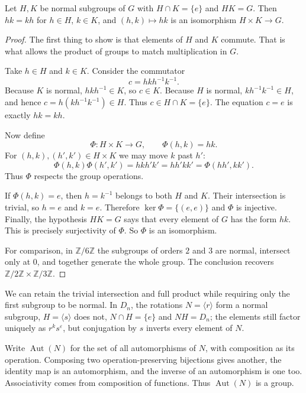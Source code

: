 \begin{proposition}\label{prop:internal}
Let $H,K$ be normal subgroups of $G$ with $H\cap K=\{e\}$ and $HK=G$. Then $hk=kh$ for $h\in H$, $k\in K$, and $(h,k)\mapsto hk$ is an isomorphism $H\times K\to G$.
\end{proposition}
\begin{proof}
The first thing to show is that elements of $H$ and $K$ commute.
That is what allows the product of groups to match multiplication in $G$.

Take $h\in H$ and $k\in K$. Consider the commutator
\[
c=hkh^{-1}k^{-1}.
\]
Because $K$ is normal, $hkh^{-1}\in K$, so $c\in K$.
Because $H$ is normal, $kh^{-1}k^{-1}\in H$, and hence
$c=h(kh^{-1}k^{-1})\in H$. Thus $c\in H\cap K=\{e\}$.
The equation $c=e$ is exactly $hk=kh$.

Now define
\[
\Phi:H\times K\longrightarrow G,\qquad
\Phi(h,k)=hk.
\]
For $(h,k),(h',k')\in H\times K$ we may move $k$ past $h'$:
\[
\Phi(h,k)\Phi(h',k')
=hkh'k'=hh'kk'
=\Phi(hh',kk').
\]
Thus $\Phi$ respects the group operations.

If $\Phi(h,k)=e$, then $h=k^{-1}$ belongs to both $H$ and
$K$. Their intersection is trivial, so $h=e$ and $k=e$.
Therefore $\ker\Phi=\{(e,e)\}$ and $\Phi$ is injective.
Finally, the hypothesis $HK=G$ says that every element of $G$
has the form $hk$. This is precisely surjectivity of $\Phi$.
So $\Phi$ is an isomorphism.

For comparison, in $\mathbb Z/6\mathbb Z$ the subgroups of
orders $2$ and $3$ are normal, intersect only at $0$, and
together generate the whole group. The conclusion recovers
$\mathbb Z/2\mathbb Z\times\mathbb Z/3\mathbb Z$.
\end{proof}

We can retain the trivial intersection and full product while requiring only the first subgroup to be normal. In $D_n$, the rotations $N=\langle r\rangle$ form a normal subgroup, $H=\langle s\rangle$ does not, $N\cap H=\{e\}$ and $NH=D_n$; the elements still factor uniquely as $r^ks^\varepsilon$, but conjugation by $s$ inverts every element of $N$.

Write $\operatorname{Aut}(N)$ for the set of all automorphisms of $N$, with composition as its operation. Composing two operation-preserving bijections gives another, the identity map is an automorphism, and the inverse of an automorphism is one too. Associativity comes from composition of functions. Thus $\operatorname{Aut}(N)$ is a group.

